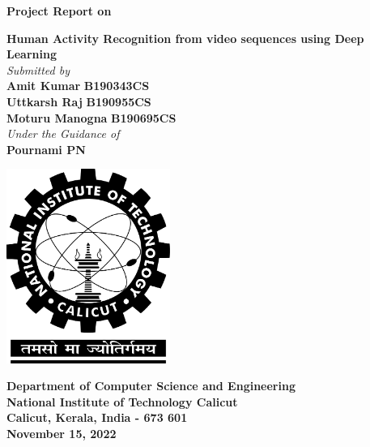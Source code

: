 \documentclass[twocolumn]{article}
\date{}
\begin{document}
\begin{titlepage}
    \begin{center}
        \vspace{1cm}
        \normalsize
        \textbf{Project Report on}\\
        \vspace{0.5cm}

        \Large
        \textbf{Human Activity Recognition from video sequences using Deep Learning}\\
        \vspace{0.5cm}
        \emph{Submitted by}\\
        \vspace{0.5cm}
        \large
        \textbf{Amit Kumar} \hspace{0.75cm}
        \textbf{B190343CS}\\
        \textbf{Uttkarsh Raj} \hspace{0.75cm}
        \textbf{B190955CS}\\
        \textbf{Moturu Manogna} \hspace{0.75cm}
        \textbf{B190695CS}\\
        \vspace{0.2cm}
        \emph{Under the Guidance of}\\
        \large
        \vspace{0.5cm}
        \textbf{Pournami PN}

        \vspace{.5cm}
        \begin{center}
            \includegraphics[width=0.4\textwidth]{nitc-logo.png}
        \end{center}
        \vspace{0.8cm}
        \textbf{Department of Computer Science and Engineering}\\
        \textbf{National Institute of Technology Calicut}\\
        \textbf{Calicut, Kerala, India - 673 601}\\
        \vspace{0.8cm}
        \textbf{November 15, 2022} %
    \end{center}
\end{titlepage}
\end{document}
